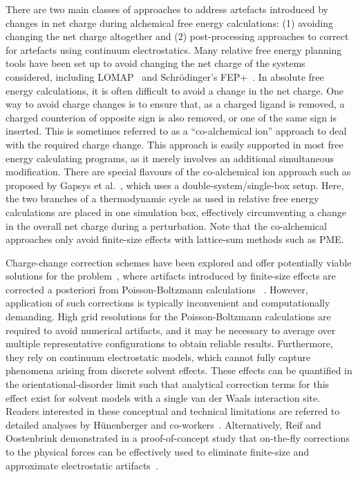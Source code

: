 \documentclass[9pt,bestpractices,pubversion]{livecoms}
\begin{document}
There are two main classes of approaches to address artefacts introduced by changes in net charge during alchemical free energy calculations: (1) avoiding changing the net charge altogether and (2) post-processing approaches to correct for artefacts using continuum electrostatics.
Many relative free energy planning tools have been set up to avoid changing the net charge of the systems considered, including LOMAP~\cite{liu2013lead} and Schr\"{o}dinger's FEP+~\cite{wang2015accurate}. In absolute free energy calculations, it is often difficult to avoid a change in the net charge. One way to avoid charge changes is to ensure that, as a charged ligand is removed, a charged counterion of opposite sign is also removed, or one of the same sign is inserted. This is sometimes referred to as a “co-alchemical ion” approach to deal with the required charge change. This approach is easily supported in most free energy calculating programs, as it merely involves an additional simultaneous modification.
There are special flavours of the co-alchemical ion approach such as proposed by Gapsys et al.~\cite{gapsys2015calculation}, which uses a double-system/single-box setup. Here, the two branches of a thermodynamic cycle as used in relative free energy calculations are placed in one simulation box, effectively circumventing a change in the overall net charge during a perturbation. Note that the co-alchemical approaches only avoid finite-size effects with lattice-sum methods such as PME.

Charge-change correction schemes have been explored and offer potentially viable solutions for the problem~\cite{mey2018impact}, where artifacts introduced by finite-size effects are corrected a posteriori from Poisson-Boltzmann calculations ~\cite{chen2018accurate, ohlknecht2020correcting, rocklin2013calculating,Reif2014chargecorrection}. However, application of such corrections is typically inconvenient and computationally demanding. High grid resolutions for the Poisson-Boltzmann calculations are required to avoid numerical artifacts, and it may be necessary to average over multiple representative configurations to obtain reliable results. Furthermore, they rely on continuum electrostatic models, which cannot fully capture phenomena arising from discrete solvent effects. These effects can be quantified in the orientational-disorder limit such that analytical correction terms for this effect exist for solvent models with a single van der Waals interaction site. Readers interested in these conceptual and technical limitations are referred to detailed analyses by Hünenberger and co-workers~\cite{kastenholz2006solvfe, rocklin2013calculating}.
Alternatively, Reif and Oostenbrink demonstrated in a proof-of-concept study that on-the-fly corrections to the physical forces can be effectively used to eliminate finite-size and approximate electrostatic artifacts~\cite{Reif2015onthefly}.
\end{document}
